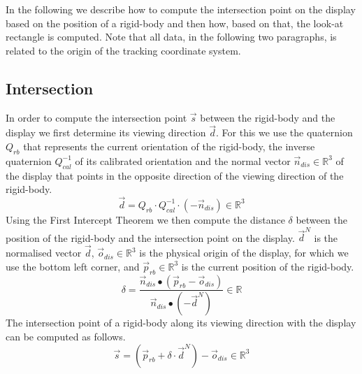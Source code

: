 \documentclass[]{article}
\begin{document}
In the following we describe how to compute the intersection point on the display based on the position of a rigid-body and then how, based on that, the look-at rectangle is computed.
Note that all data, in the following two paragraphs, is related to the origin of the tracking coordinate system.

\subsection{Intersection}

In order to compute the intersection point $\overrightarrow{s}$ between the rigid-body and the display we first determine its viewing direction $\overrightarrow{d}$.
For this we use the quaternion $Q_{rb}$ that represents the current orientation of the rigid-body, the inverse quaternion $Q^{-1}_{cal}$ of its calibrated orientation and the normal vector $\overrightarrow{n}_{dis} \in \mathbb{R}^{3}$ of the display that points in the opposite direction of the viewing direction of the rigid-body.
%
\begin{equation*}
\overrightarrow{d} = Q_{rb} \cdot Q^{-1}_{cal} \cdot (-\overrightarrow{n}_{dis}) \in \mathbb{R}^{3}
\end{equation*}
%
Using the First Intercept Theorem we then compute the distance $\delta$ between the position of the rigid-body and the intersection point on the display.
$\overrightarrow{d}^{N}$ is the normalised vector $\overrightarrow{d}$, $\overrightarrow{o}_{dis} \in \mathbb{R}^{3}$ is the physical origin of the display, for which we use the bottom left corner, and $\overrightarrow{p}_{rb} \in \mathbb{R}^{3}$ is the current position of the rigid-body.
%
\begin{equation}\label{eq:implementation:tracking:intersection} 
\delta = \frac{\overrightarrow{n}_{dis} \bullet (\overrightarrow{p}_{rb} - \overrightarrow{o}_{dis}) } 
{\overrightarrow{n}_{dis} \bullet (-\overrightarrow{d}^{N}) } \in \mathbb{R}
\end{equation}
%
The intersection point of a rigid-body along its viewing direction with the display can be computed as follows.
%
\begin{equation}\label{eq:implementation:tracking:inner}  
\overrightarrow{s} = (\overrightarrow{p}_{rb} + \delta \cdot \overrightarrow{d}^{N}) - \overrightarrow{o}_{dis} \in \mathbb{R}^{3} 
\end{equation}
\end{document}
